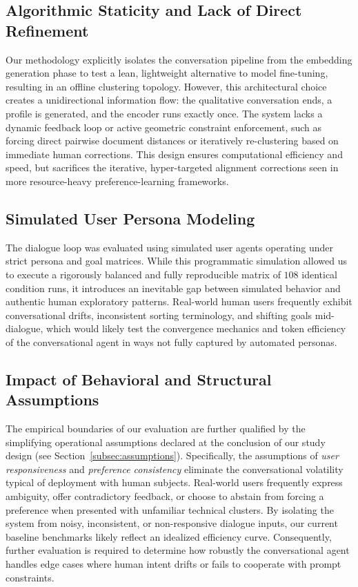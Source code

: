 \subsection{Algorithmic Staticity and Lack of Direct Refinement}
Our methodology explicitly isolates the conversation pipeline from the embedding generation phase to test a lean, lightweight alternative to model fine-tuning, resulting in an offline clustering topology. 
However, this architectural choice creates a unidirectional information flow: the qualitative conversation ends, a profile is generated, and the encoder runs exactly once. 
The system lacks a dynamic feedback loop or active geometric constraint enforcement, such as forcing direct pairwise document distances or iteratively re-clustering based on immediate human corrections. 
This design ensures computational efficiency and speed, but sacrifices the iterative, hyper-targeted alignment corrections seen in more resource-heavy preference-learning frameworks.

\subsection{Simulated User Persona Modeling}
The dialogue loop was evaluated using simulated user agents operating under strict persona and goal matrices. 
While this programmatic simulation allowed us to execute a rigorously balanced and fully reproducible matrix of $108$ identical condition runs, it introduces an inevitable gap between simulated behavior and authentic human exploratory patterns.
Real-world human users frequently exhibit conversational drifts, inconsistent sorting terminology, and shifting goals mid-dialogue, which would likely test the convergence mechanics and token efficiency of the conversational agent in ways not fully captured by automated personas.

\subsection{Impact of Behavioral and Structural Assumptions}
The empirical boundaries of our evaluation are further qualified by the simplifying operational assumptions declared at the conclusion of our study design (see Section~\ref{subsec:assumptions}). 
Specifically, the assumptions of \textit{user responsiveness} and \textit{preference consistency} eliminate the conversational volatility typical of deployment with human subjects. 
Real-world users frequently express ambiguity, offer contradictory feedback, or choose to abstain from forcing a preference when presented with unfamiliar technical clusters. 
By isolating the system from noisy, inconsistent, or non-responsive dialogue inputs, our current baseline benchmarks likely reflect an idealized efficiency curve. 
Consequently, further evaluation is required to determine how robustly the conversational agent handles edge cases where human intent drifts or fails to cooperate with prompt constraints.

